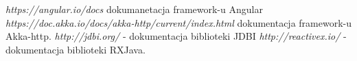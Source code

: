 \begin{thebibliography}{}
	

	\emph{https://angular.io/docs} dokumanetacja framework-u Angular
	\emph{https://doc.akka.io/docs/akka-http/current/index.html} dokumentacja framework-u Akka-http.
 \emph{http://jdbi.org/} - dokumentacja biblioteki JDBI
 \emph{http://reactivex.io/} - dokumentacja biblioteki RXJava.



\end{thebibliography}